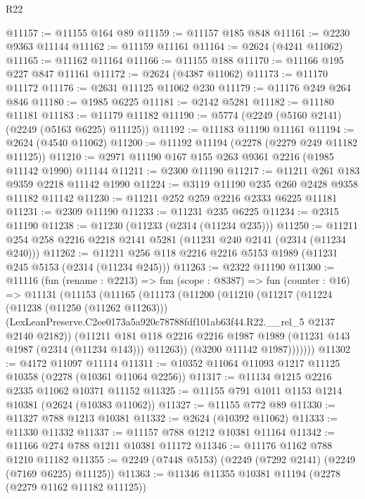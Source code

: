 \begin{lexlean}{R22}
\begin{coremodule}
@11157 := @11155 @164 @89
@11159 := @11157 @185 @848
@11161 := @2230 @9363 @11144
@11162 := @11159 @11161
@11164 := @2624 (@4241 @11062)
@11165 := @11162 @11164
@11166 := @11155 @188
@11170 := @11166 @195 @227 @847 @11161
@11172 := @2624 (@4387 @11062)
@11173 := @11170 @11172
@11176 := @2631 @11125 @11062 @230
@11179 := @11176 @249 @264 @846
@11180 := @1985 @6225
@11181 := @2142 @5281
@11182 := @11180 @11181
@11183 := @11179 @11182
@11190 := @5774 (@2249 (@5160 @2141) (@2249 (@5163 @6225) @11125))
@11192 := @11183 @11190 @11161
@11194 := @2624 (@4540 @11062)
@11200 := @11192 @11194 (@2278 (@2279 @249 @11182 @11125))
@11210 := @2971 @11190 @167 @155 @263 @9361 @2216 (@1985 @11142 @1990) @11144
@11211 := @2300 @11190
@11217 := @11211 @261 @183 @9359 @2218 @11142 @1990
@11224 := @3119 @11190 @235 @260 @2428 @9358 @11182 @11142
@11230 := @11211 @252 @259 @2216 @2333 @6225 @11181
@11231 := @2309 @11190
@11233 := @11231 @235 @6225
@11234 := @2315 @11190
@11238 := @11230 (@11233 (@2314 (@11234 @235)))
@11250 := @11211 @254 @258 @2216 @2218 @2141 @5281 (@11231 @240 @2141 (@2314 (@11234 @240)))
@11262 := @11211 @256 @118 @2216 @2216 @5153 @1989 (@11231 @245 @5153 (@2314 (@11234 @245)))
@11263 := @2322 @11190
@11300 := @11116
    (fun (rename : @2213) =>
    fun (scope : @8387) =>
    fun (counter : @16) =>
    @11131
      (@11153
        (@11165
          (@11173
            (@11200
              (@11210
                (@11217
                  (@11224
                    (@11238 (@11250 (@11262 @11263)))
                    (LexLeanPreserve.C2ee0173a5a920c78788fdf101ab63f44.R22.__rel_5
                      @2137
                      @2140
                      @2182))
                  (@11211
                    @181
                    @118
                    @2216
                    @2216
                    @1987
                    @1989
                    (@11231 @143 @1987 (@2314 (@11234 @143)))
                    @11263))
                (@3200 @11142 @1987)))))))
@11302 := @4172 @11097 @11114
@11311 := @10352 @11064 @11093 @1217 @11125 @10358 (@2278 (@10361 @11064 @2256))
@11317 := @11134 @1215 @2216 @2335 @11062 @10371 @11152
@11325 := @11155 @791 @1011 @1153 @1214 @10381 (@2624 (@10383 @11062))
@11327 := @11155 @772 @89
@11330 := @11327 @788 @1213 @10381
@11332 := @2624 (@10392 @11062)
@11333 := @11330 @11332
@11337 := @11157 @788 @1212 @10381 @11164
@11342 := @11166 @274 @788 @1211 @10381 @11172
@11346 := @11176 @1162 @788 @1210 @11182
@11355 := @2249 (@7448 @5153) (@2249 (@7292 @2141) (@2249 (@7169 @6225) @11125))
@11363 := @11346 @11355 @10381 @11194 (@2278 (@2279 @1162 @11182 @11125))

\end{coremodule}
\end{lexlean}
